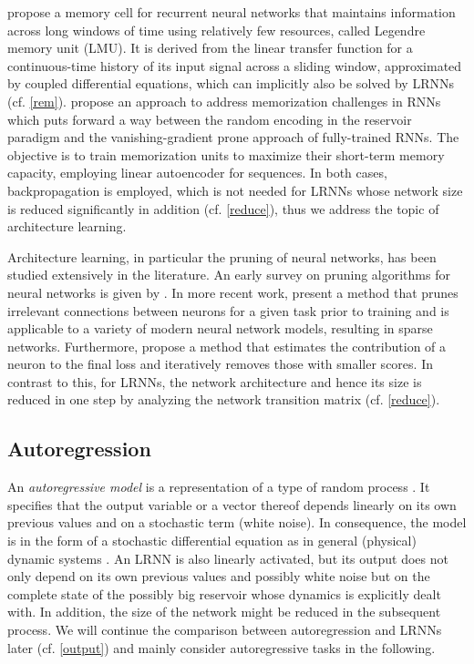\documentclass[twoside,11pt]{article}
\theoremstyle{definition}
\begin{document}
\citet{VKE19} propose a memory cell for recurrent neural networks that maintains
information across long windows of time using relatively few resources, called
Legendre memory unit (LMU). It is derived from the linear transfer function for
a continuous-time history of its input signal across a sliding window,
approximated by coupled differential equations, which can implicitly also be
solved by LRNNs (cf. \cref{rem}).
\citet{CSB21} propose an approach to address memorization challenges in RNNs
which puts forward a way between the random encoding in the reservoir paradigm
and the vanishing-gradient prone approach of fully-trained RNNs. The objective
is to train memorization units to maximize their short-term memory capacity,
employing linear autoencoder for sequences. In both cases, backpropagation is
employed, which is not needed for LRNNs whose network size is reduced
significantly in addition (cf. \cref{reduce}), thus we address the topic of
architecture learning.

Architecture learning, in particular the pruning of neural networks, has been
studied extensively in the literature. An early survey on pruning algorithms
for neural networks is given by \citet{Ree93}. In more recent work,
\citet{LAT19} present a method that prunes irrelevant connections between
neurons for a given task prior to training and is applicable to a variety of
modern neural network models, resulting in sparse networks. Furthermore,
\citet{MM+19} propose a method that estimates the contribution of a neuron to
the final loss and iteratively removes those with smaller scores. In contrast to
this, for LRNNs, the network architecture and hence its size is reduced in one
step by analyzing the network transition matrix (cf. \cref{reduce}).

\subsection{Autoregression}\label{regress}

An \emph{autoregressive model} is a representation of a type of random process
\citep{Aka69}. It specifies that the output variable or a vector thereof depends
linearly on its own previous values and on a stochastic term (white noise). In
consequence, the model is in the form of a stochastic differential equation as in
general (physical) dynamic systems \citep{CK14}. An LRNN is also linearly
activated, but its output does not only depend on its own previous values and
possibly white noise but on the complete state of the possibly big reservoir
whose dynamics is explicitly dealt with. In addition, the size of the network
might be reduced in the subsequent process. We will continue the comparison
between autoregression and LRNNs later (cf. \cref{output}) and mainly consider
autoregressive tasks in the following.
\end{document}
